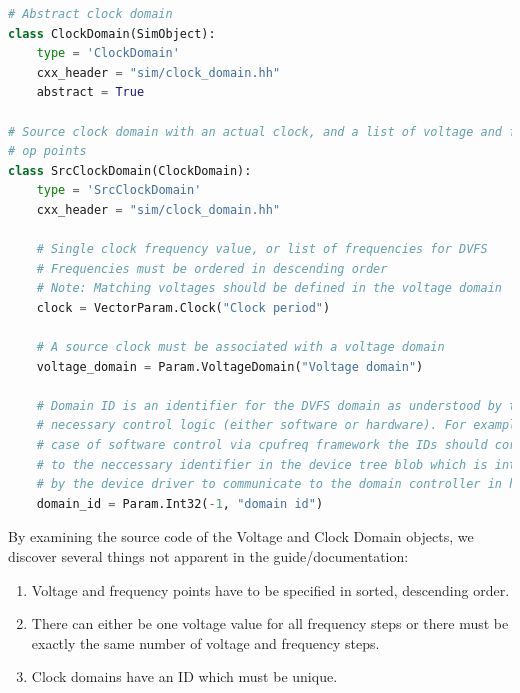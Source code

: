     \begin{lstlisting}[caption=Lines 44-69 from 
    \texttt{gem5/src/sim/ClockDomain.py}, basicstyle=\sffamily\footnotesize,
    language=Python]
# Abstract clock domain
class ClockDomain(SimObject):
    type = 'ClockDomain'
    cxx_header = "sim/clock_domain.hh"
    abstract = True

# Source clock domain with an actual clock, and a list of voltage and frequency
# op points
class SrcClockDomain(ClockDomain):
    type = 'SrcClockDomain'
    cxx_header = "sim/clock_domain.hh"
    
    # Single clock frequency value, or list of frequencies for DVFS
    # Frequencies must be ordered in descending order
    # Note: Matching voltages should be defined in the voltage domain
    clock = VectorParam.Clock("Clock period")
    
    # A source clock must be associated with a voltage domain
    voltage_domain = Param.VoltageDomain("Voltage domain")
    
    # Domain ID is an identifier for the DVFS domain as understood by the
    # necessary control logic (either software or hardware). For example, in
    # case of software control via cpufreq framework the IDs should correspond
    # to the neccessary identifier in the device tree blob which is interpretted
    # by the device driver to communicate to the domain controller in hardware.
    domain_id = Param.Int32(-1, "domain id")
    \end{lstlisting}
    By examining the source code of the Voltage and Clock Domain objects, we 
    discover several things not apparent in the guide/documentation:
    \begin{enumerate}
        \item Voltage and frequency points have to be specified in sorted,
              descending order.
        \item There can either be one voltage value for all frequency steps or
              there must be exactly the same number of voltage and frequency 
              steps.
        \item Clock domains have an ID which must be unique.
    \end{enumerate}

